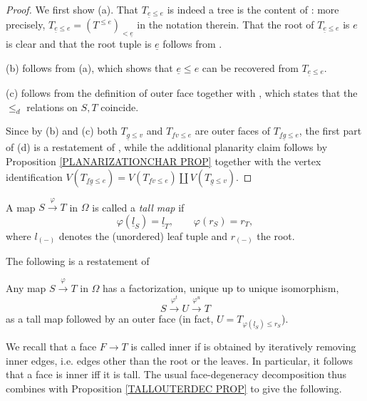 \documentclass[a4paper,10pt]{article}%
\begin{document}
\begin{proof}
We first show (a). That $T_{\underline{e} \leq e}$ is indeed a tree is the content of \cite[Prop. 5.20]{Pe17}: more precisely, 
$T_{\underline{e} \leq e} = (T^{\leq e})_{\less \underline{e}}$
in the notation therein. That the root of $T_{\underline{e} \leq e}$ is $e$ is clear and that the root tuple is $\underline{e}$ follows from \cite[Remark 5.23]{Pe17}.

 (b) follows from (a), which shows that $\underline{e} \leq e$ can be recovered from
$T_{\underline{e} \leq e}$.

 (c) follows from the definition of outer face together with \cite[Lemma 5.33]{Pe17}, which states that the $\leq_d$ relations on $S,T$ coincide.
 
  Since by (b) and (c) both $T_{\underline{g} \leq v}$ and $T_{\underline{f}v \leq e}$ are outer faces of $T_{\underline{f} \underline{g} \leq e}$, 
the first part of (d) is a restatement of \cite[Prop. 5.15]{Pe17}, while the additional planarity claim 
follows by Proposition \ref{PLANARIZATIONCHAR PROP}
together with the vertex identification
$V(T_{\underline{f} \underline{g} \leq e})=
V(T_{\underline{f} v \leq e}) \amalg V(T_{\underline{g} \leq v})$.
\end{proof}


\begin{definition}
	A map $S \xrightarrow{\varphi} T$ in $\Omega$ is called a \textit{tall map} if 
	\[\varphi(\underline{l}_S) = \underline{l}_T, 
		\qquad
	\varphi(r_S)= r_T,\]
where $l_{(\minus)}$ denotes the (unordered) leaf tuple and $r_{(\minus)}$ the root.
\end{definition}


The following is a restatement of \cite[Cor. 5.24]{Pe17}

\begin{proposition}\label{TALLOUTERDEC PROP}
	Any map $S \xrightarrow{\varphi} T$ in $\Omega$ has a factorization, unique up to unique isomorphism,
	\[
		S \xrightarrow{\varphi^t} U \xrightarrow{\varphi^u} T
	\]
	as a tall map followed by an outer face (in fact, 
	$U= T_{\varphi(\underline{l}_S) \leq r_S}$).
\end{proposition}

We recall that a face $F \to T$ is called inner if is obtained by iteratively removing inner edges, i.e. edges other than the root or the leaves. In particular, it follows that a face is inner iff it is tall. The usual face-degeneracy decomposition thus combines with Proposition \ref{TALLOUTERDEC PROP} to give the following.
\end{document}
